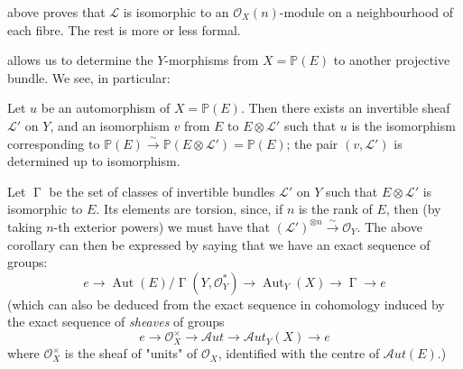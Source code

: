 \begin{cproof}
     above proves that $\mathcal{L}$ is isomorphic to an $\mathcal{O}_X(n)$-module on a neighbourhood of each fibre.
    The rest is more or less formal.
\end{cproof}


 allows us to determine the $Y$-morphisms from $X=\mathbb{P}(E)$ to another projective bundle.
We see, in particular:

\begin{corollary}\label{fga2-proposition-2-corollary-1}
    Let $u$ be an automorphism of $X=\mathbb{P}(E)$.
    Then there exists an invertible sheaf $\mathcal{L}'$ on $Y$, and an isomorphism $v$ from $E$ to $E\otimes\mathcal{L}'$ such that $u$ is the isomorphism corresponding to $\mathbb{P}(E)\xrightarrow{\sim}\mathbb{P}(E\otimes\mathcal{L}')=\mathbb{P}(E)$;
    the pair $(v,\mathcal{L}')$ is determined up to isomorphism.
\end{corollary}

Let $\operatorname{\Gamma}$ be the set of classes of invertible bundles $\mathcal{L}'$ on $Y$ such that $E\otimes\mathcal{L}'$ is isomorphic to $E$.
Its elements are torsion, since, if $n$ is the rank of $E$, then (by taking $n$-th exterior powers) we must have that $(\mathcal{L}')^{\otimes n}\xrightarrow{\sim}\mathcal{O}_Y$.
The above corollary can then be expressed by saying that we have an exact sequence of groups:
\[e \to \operatorname{Aut}(E)/\operatorname{\Gamma}(Y,\mathcal{O}_Y^*) \to \operatorname{Aut}_Y(X) \to \operatorname{\Gamma} \to e\]
(which can also be deduced from the exact sequence in cohomology induced by the exact sequence of \emph{sheaves} of groups
\[e \to \mathcal{O}_X^\times \to \mathcal{A}ut \to \mathcal{A}ut_Y(X) \to e\]
where $\mathcal{O}_X^\times$ is the sheaf of "units" of $\mathcal{O}_X$, identified with the centre of $\mathcal{A}ut(E)$.)
